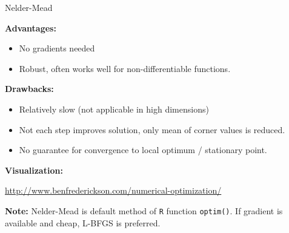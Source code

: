 \documentclass[11pt,compress,t,notes=noshow, xcolor=table]{beamer}
\begin{document}




\begin{vbframe}{Nelder-Mead}
\small

\textbf{Advantages:}
\begin{itemize}
    \item No gradients needed
    \item Robust, often works well for non-differentiable functions.
\end{itemize}
\textbf{Drawbacks:}
\begin{itemize}
    \item Relatively slow (not applicable in high dimensions)
    \item Not each step improves solution, only mean of corner values is reduced.
    \item No guarantee for convergence to local optimum / stationary point.
\end{itemize}

\textbf{Visualization:}
\begin{center}
    \url{http://www.benfrederickson.com/numerical-optimization/}
\end{center}

\vspace{0.3cm}
\textbf{Note:} Nelder-Mead is default method of \texttt{R} function \texttt{optim()}.
If gradient is available and cheap, L-BFGS is preferred.

\end{vbframe}
\end{document}

